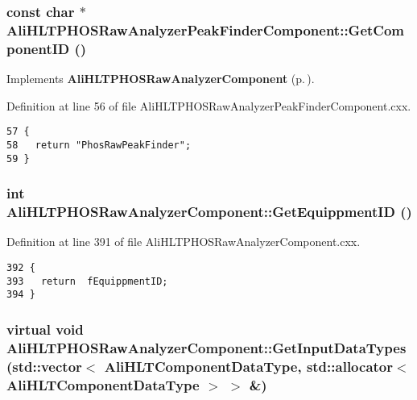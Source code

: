 \subsubsection{\setlength{\rightskip}{0pt plus 5cm}const char $\ast$ Ali\-HLTPHOSRaw\-Analyzer\-Peak\-Finder\-Component::Get\-Component\-ID ()\hspace{0.3cm}{\tt  [virtual]}}\label{classAliHLTPHOSRawAnalyzerPeakFinderComponent_AliHLTPHOSRawAnalyzerPeakFinderComponenta2}




Implements {\bf Ali\-HLTPHOSRaw\-Analyzer\-Component} {\rm (p.\,\pageref{classAliHLTPHOSRawAnalyzerComponent_AliHLTPHOSRawAnalyzerComponenta13})}.

Definition at line 56 of file Ali\-HLTPHOSRaw\-Analyzer\-Peak\-Finder\-Component.cxx.

\footnotesize\begin{verbatim}57 {
58   return "PhosRawPeakFinder";
59 }
\end{verbatim}\normalsize 


\subsubsection{\setlength{\rightskip}{0pt plus 5cm}int Ali\-HLTPHOSRaw\-Analyzer\-Component::Get\-Equippment\-ID ()\hspace{0.3cm}{\tt  [inherited]}}\label{classAliHLTPHOSRawAnalyzerComponent_AliHLTPHOSRawAnalyzerPeakFinderComponenta11}




Definition at line 391 of file Ali\-HLTPHOSRaw\-Analyzer\-Component.cxx.

\footnotesize\begin{verbatim}392 {
393   return  fEquippmentID;
394 }
\end{verbatim}\normalsize 


\subsubsection{\setlength{\rightskip}{0pt plus 5cm}virtual void Ali\-HLTPHOSRaw\-Analyzer\-Component::Get\-Input\-Data\-Types (std::vector$<$ Ali\-HLTComponent\-Data\-Type, std::allocator$<$ Ali\-HLTComponent\-Data\-Type $>$ $>$ \&)\hspace{0.3cm}{\tt  [virtual, inherited]}}\label{classAliHLTPHOSRawAnalyzerComponent_AliHLTPHOSRawAnalyzerPeakFinderComponenta13}


